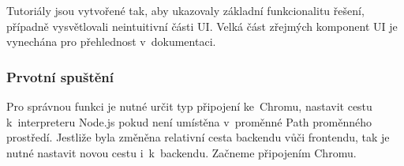 \documentclass[12pt, a4paper, twoside]{article}
\begin{document}
	Tutoriály jsou vytvořené tak, aby ukazovaly základní funkcionalitu řešení, případně vysvětlovali neintuitivní části UI. Velká část zřejmých komponent UI je vynechána pro přehlednost v~dokumentaci.
	\subsubsection{Prvotní spuštění}
	\label{subsub_sec:firstRun}
	
	Pro správnou funkci je nutné určit typ připojení ke~Chromu, nastavit cestu k~interpreteru Node.js pokud není umístěna v~proměnné Path proměnného prostředí. Jestliže byla změněna relativní cesta backendu vůči frontendu, tak je nutné nastavit novou cestu i~k~backendu. Začneme připojením Chromu.
\end{document}
